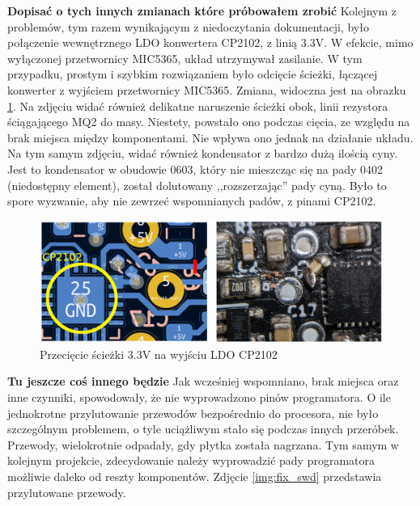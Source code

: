 \textbf{Dopisać o tych innych zmianach które próbowałem zrobić}
Kolejnym z problemów, tym razem wynikającym z niedoczytania dokumentacji, było połączenie wewnętrznego LDO konwertera CP2102, z linią 3.3V. W efekcie, mimo wyłączonej przetwornicy MIC5365, układ utrzymywał zasilanie. W tym przypadku, prostym i szybkim rozwiązaniem było odcięcie ścieżki, łączącej konwerter z wyjściem przetwornicy MIC5365. Zmiana, widoczna jest na obrazku \ref{img:fix_ldo_cp}. Na zdjęciu widać również delikatne naruszenie ścieżki obok, linii rezystora ściągającego MQ2 do masy. Niestety, powstało ono podczas cięcia, ze względu na brak miejsca między komponentami. Nie wpływa ono jednak na działanie układu. Na tym samym zdjęciu, widać również kondensator z bardzo dużą ilością cyny. Jest to kondensator w obudowie 0603, który nie mieszcząc się na pady 0402 (niedostępny element), został dolutowany ,,rozszerzając'' pady cyną. Było to spore wyzwanie, aby nie zewrzeć wspomnianych padów, z pinami CP2102.
\begin{figure}[H]
    \centering
    \includegraphics[width=\textwidth, height=\textheight, keepaspectratio]{Graphics/fix_ldo_cp.png}
    \caption{Przecięcie ścieżki 3.3V na wyjściu LDO CP2102}
    \label{img:fix_ldo_cp}
\end{figure}

\textbf{Tu jeszcze coś innego będzie} \newline
Jak wcześniej wspomniano, brak miejsca oraz inne czynniki, spowodowały, że nie wyprowadzono pinów programatora. O ile jednokrotne przylutowanie przewodów bezpośrednio do procesora, nie było szczególnym problemem, o tyle uciążliwym stało się podczas innych przeróbek. Przewody, wielokrotnie odpadały, gdy płytka została nagrzana. Tym samym w kolejnym projekcie, zdecydowanie należy wyprowadzić pady programatora możliwie daleko od reszty komponentów. Zdjęcie \ref{img:fix_swd} przedstawia przylutowane przewody.

